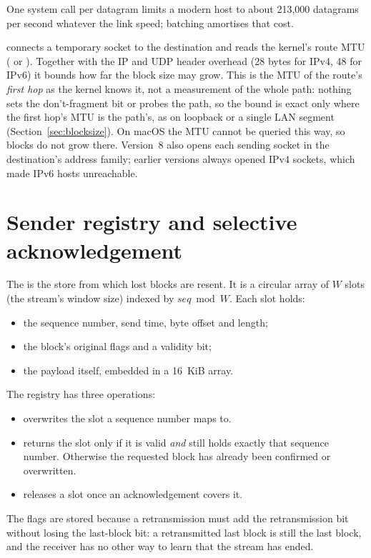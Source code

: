 One system call per datagram limits a modern host to about 213,000 datagrams per second whatever the link
speed; batching amortises that cost.

\vviii{} connects a temporary socket to the destination and reads the kernel's route MTU
( or ). Together with the IP and UDP header overhead (28 bytes for IPv4, 48 for IPv6)
it bounds how far the block size may grow. This is the MTU of the route's \emph{first hop} as the kernel knows
it, not a measurement of the whole path: nothing sets the don't-fragment bit or probes the path, so the bound is
exact only where the first hop's MTU is the path's, as on loopback or a single LAN segment
(Section~\ref{sec:blocksize}). On macOS the MTU cannot be queried this way, so blocks do not grow there. Version~8 also opens each sending socket in the destination's address family; earlier versions always
opened IPv4 sockets, which made IPv6 hosts unreachable.

\section{Sender registry and selective acknowledgement}\label{sec:registry}

The  is the store from which lost blocks are resent. It is a circular array of
$W$ slots (the stream's window size) indexed by $\mathit{seq}\bmod W$. Each slot holds:
\begin{itemize}
  \item the sequence number, send time, byte offset and length;
  \item the block's original flags and a validity bit;
  \item the payload itself, embedded in a 16~KiB array.
\end{itemize}

The registry has three operations:
\begin{itemize}
  \item {} overwrites the slot a sequence number maps to.
  \item {} returns the slot only if it is valid \emph{and} still holds exactly that sequence number.
    Otherwise the requested block has already been confirmed or overwritten.
  \item {} releases a slot once an acknowledgement covers it.
\end{itemize}
The flags are stored because a retransmission must add the retransmission bit without losing the last-block
bit: a retransmitted last block is still the last block, and the receiver has no other way to learn that the
stream has ended.

